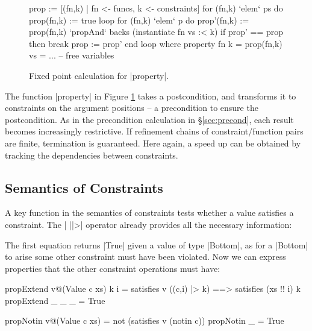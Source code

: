 \documentclass[preprint]{sigplanconf}
\begin{document}
\begin{figure}
\ignore\begin{code}
prop := [(fn,k) | fn <- funcs, k <- constraints]
for (fn,k) `elem` ps do prop(fn,k) := true
loop
    for (fn,k) `elem` p do
        prop'(fn,k) := prop(fn,k) `propAnd` backs (instantiate fn vs :< k)
    if prop' == prop then break
    prop := prop'
end loop
    where
        property fn k = prop(fn,k)
        vs = ... -- free variables
\end{code}
\caption{Fixed point calculation for |property|.}
\label{fig:property_fixp}
\end{figure}

The function |property| in Figure \ref{fig:property_fixp} takes a postcondition, and transforms it to constraints on the argument positions -- a precondition to ensure the postcondition. As in the precondition calculation in \S\ref{sec:precond}, each result becomes increasingly restrictive. If refinement chains of constraint/function pairs are finite, termination is guaranteed. Here again, a speed up can be obtained by tracking the dependencies between constraints.

\subsection{Semantics of Constraints}

A key function in the semantics of constraints tests whether a value satisfies a constraint. The | ||>| operator already provides all the necessary information:

\noindent\begin{minipage}{\linewidth}
\end{minipage}

The first equation returns |True| given a value of type |Bottom|, as for a |Bottom| to arise some other constraint must have been violated. Now we can express properties that the other constraint operations must have:

\begin{code}
propExtend  v@(Value c xs) k i =
    satisfies v ((c,i) |> k) ==> satisfies (xs !! i) k
propExtend _ _ _ = True

propNotin  v@(Value c xs) = not (satisfies v (notin c))
propNotin  _ = True
\end{code}
\end{document}
